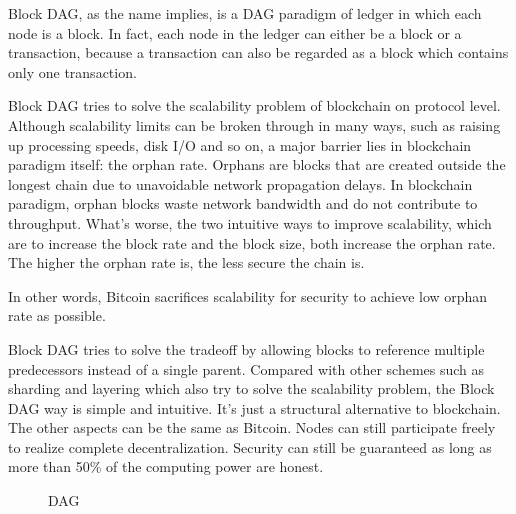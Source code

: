 \documentclass[a4paper,11pt]{article}
\begin{document}
Block DAG, as the name implies, is a DAG paradigm of ledger in which each node
is a block. In fact, each node in the ledger can either be a block or a
transaction, because a transaction can also be regarded as a block which
contains only one transaction.

Block DAG tries to solve the scalability problem of blockchain on protocol
level. Although scalability limits can be broken through in many ways, such as
raising up processing speeds, disk I/O and so on, a major barrier lies in
blockchain paradigm itself: the orphan rate. Orphans are blocks that are created
outside the longest chain due to unavoidable network propagation delays. In
blockchain paradigm, orphan blocks waste network bandwidth and do not contribute
to throughput. What's worse, the two intuitive ways to improve scalability, which
are to increase the block rate and the block size, both increase the orphan
rate. The higher the orphan rate is, the less secure the chain
is\cite{Yonatan-high-rate-bitcoin}\cite{bitcoin-backbone}\cite{https://eprint.iacr.org/2016/454.pdf}.

In other words, Bitcoin sacrifices scalability for security to achieve low
orphan rate as possible.

Block DAG tries to solve the tradeoff by allowing blocks to reference multiple
predecessors instead of a single parent. Compared with other schemes such as
sharding and layering which also try to solve the scalability problem, the Block
DAG way is simple and intuitive. It's just a structural alternative to
blockchain. The other aspects can be the same as Bitcoin. Nodes can still
participate freely to realize complete decentralization.  Security can still be
guaranteed as long as more than 50\% of the computing power are honest.

\begin{figure}[hbt]
	\centerline{%
	}
\caption{DAG}
\end{figure}
\end{document}
